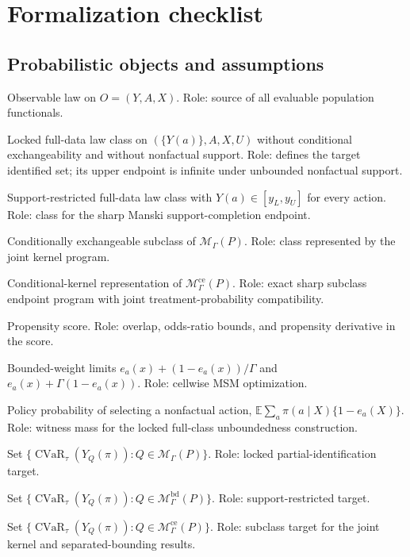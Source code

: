 \documentclass[11pt]{article}
\newcommand{\E}{\mathbb{E}}
\newcommand{\calH}{\mathcal{H}}
\theoremstyle{definition}
\theoremstyle{plain}
\theoremstyle{remark}
\begin{document}
\section{Formalization checklist}
\subsection*{Probabilistic objects and assumptions}
\begin{description}[leftmargin=4.1cm,style=sameline]
\item[\(P\)] Observable law on \(O=(Y,A,X)\).  Role: source of all evaluable
population functionals.
\item[\(\mathcal M_\Gamma(P)\)] Locked full-data law class on
\((\{Y(a)\},A,X,U)\) without conditional exchangeability and without
nonfactual support.  Role: defines the target identified set; its upper endpoint
is infinite under unbounded nonfactual support.
\item[\(\mathcal M_\Gamma^{\mathrm{bd}}(P)\)] Support-restricted full-data law
class with \(Y(a)\in[y_L,y_U]\) for every action.  Role: class for the sharp
Manski support-completion endpoint.
\item[\(\mathcal M_\Gamma^{\mathrm{ce}}(P)\)] Conditionally exchangeable
subclass of \(\mathcal M_\Gamma(P)\).  Role: class represented by the joint
kernel program.
\item[\(\calH_\Gamma(P)\)] Conditional-kernel representation of
\(\mathcal M_\Gamma^{\mathrm{ce}}(P)\).  Role: exact sharp subclass endpoint
program with joint treatment-probability compatibility.
\item[\(e_a(x)\)] Propensity score.  Role: overlap, odds-ratio bounds, and
propensity derivative in the score.
\item[\(\ell_a(x),u_a(x)\)] Bounded-weight limits
\(e_a(x)+(1-e_a(x))/\Gamma\) and \(e_a(x)+\Gamma(1-e_a(x))\).  Role: cellwise
MSM optimization.
\item[\(q_\pi(P)\)] Policy probability of selecting a nonfactual action,
\(\E\sum_a\pi(a\mid X)\{1-e_a(X)\}\).  Role: witness mass for the locked
full-class unboundedness construction.
\item[\(\Theta_I(P)\)] Set
\(\{\operatorname{CVaR}_{\tau}(Y_Q(\pi)):Q\in\mathcal M_\Gamma(P)\}\).  Role:
locked partial-identification target.
\item[\(\Theta_I^{\mathrm{bd}}(P)\)] Set
\(\{\operatorname{CVaR}_{\tau}(Y_Q(\pi)):Q\in
\mathcal M_\Gamma^{\mathrm{bd}}(P)\}\).  Role: support-restricted target.
\item[\(\Theta_I^{\mathrm{ce}}(P)\)] Set
\(\{\operatorname{CVaR}_{\tau}(Y_Q(\pi)):Q\in
\mathcal M_\Gamma^{\mathrm{ce}}(P)\}\).  Role: subclass target for the joint
kernel and separated-bounding results.
\end{description}
\end{document}
